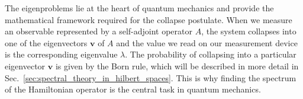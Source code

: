 The eigenproblems lie at the heart of quantum mechanics and provide the mathematical framework required for the collapse postulate. When we measure an observable represented by a self-adjoint operator $A$, the system collapses into one of the eigenvectors $\symbf{v}$ of $A$ and the value we read on our measurement device is the corresponding eigenvalue $\lambda$. The probability of collapsing into a particular eigenvector $\symbf{v}$ is given by the Born rule, which will be described in more detail in Sec.~\ref{sec:spectral_theory_in_hilbert_spaces}. This is why finding the spectrum of the Hamiltonian operator is the central task in quantum mechanics.
